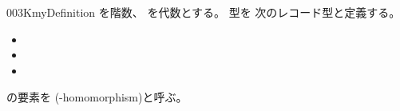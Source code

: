 \documentclass[index]{subfiles}
\begin{document}
\begin{myBlock}{003K}{myDefinition}
  を階数、
  を\myInlineMath{\myCircle}代数とする。
  型を
  次のレコード型と定義する。
  \begin{itemize}
  \item {}
  \item {}
  \item {}
  \end{itemize}
  の要素を
  (\myInlineMath{\myCircle}-homomorphism)と呼ぶ。
\end{myBlock}
\end{document}
